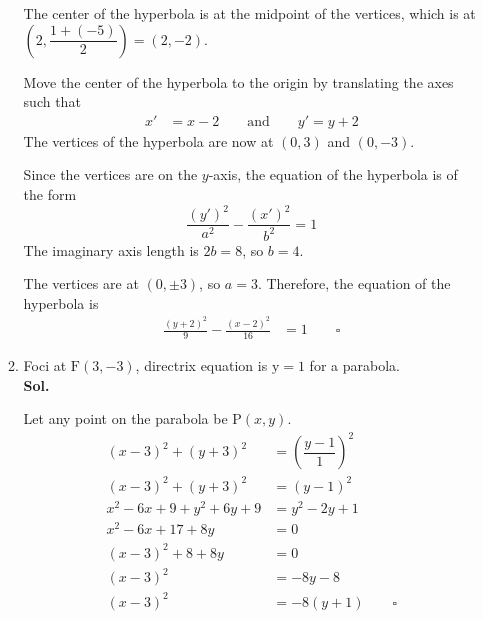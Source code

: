 \documentclass{report}
\newcommand{\sol}{\vspace{1em}\\\textbf{Sol.}}
\newcommand{\eos}{ \qquad \square}
\begin{document}
\begin{enumerate}
\begin{enumerate}
                    The center of the hyperbola is at the midpoint of the vertices, which is at
                    $\left(2,\dfrac{1+(-5)}{2}\right) = \left(2,-2\right)$.

                    Move the center of the hyperbola to the origin by translating the axes such
                    that
                    \begin{align*}
                        x' & = x - 2 \qquad \text{and} \qquad y' = y + 2
                    \end{align*}
                    The vertices of the hyperbola are now at $(0, 3)$ and $(0, -3)$.

                    Since the vertices are on the $y$-axis, the equation of the hyperbola is of the
                    form
                    \begin{equation*}
                        \frac{(y')^2}{a^2} - \frac{(x')^2}{b^2} = 1
                    \end{equation*}
                    The imaginary axis length is $2b=8$, so $b=4$.

                    The vertices are at $(0, \pm 3)$, so $a=3$. Therefore, the equation of the
                    hyperbola is
                    \begin{align*}
                        \frac{(y+2)^2}{9} - \frac{(x-2)^2}{16} & = 1 \eos
                    \end{align*}

                    \newpage
              \item Foci at $\mathrm{F}(3,-3)$, directrix equation is $\mathrm{y}=1$ for a
                    parabola. \sol{}

                    Let any point on the parabola be $\mathrm{P}(x,y)$.
                    \begin{align*}
                        (x-3)^2 + (y+3)^2           & = \left(\dfrac{y-1}{1}\right)^2 \\
                        (x-3)^2 + (y+3)^2           & = (y-1)^2                       \\
                        x^2 - 6x + 9 + y^2 + 6y + 9 & = y^2 - 2y + 1                  \\
                        x^2 - 6x + 17 + 8y          & = 0                             \\
                        (x - 3)^2 + 8 + 8y          & = 0                             \\
                        (x - 3)^2                   & = -8y - 8                       \\
                        (x - 3)^2                   & = -8(y + 1) \eos
                    \end{align*}
          \end{enumerate}


\end{enumerate}
\end{document}

